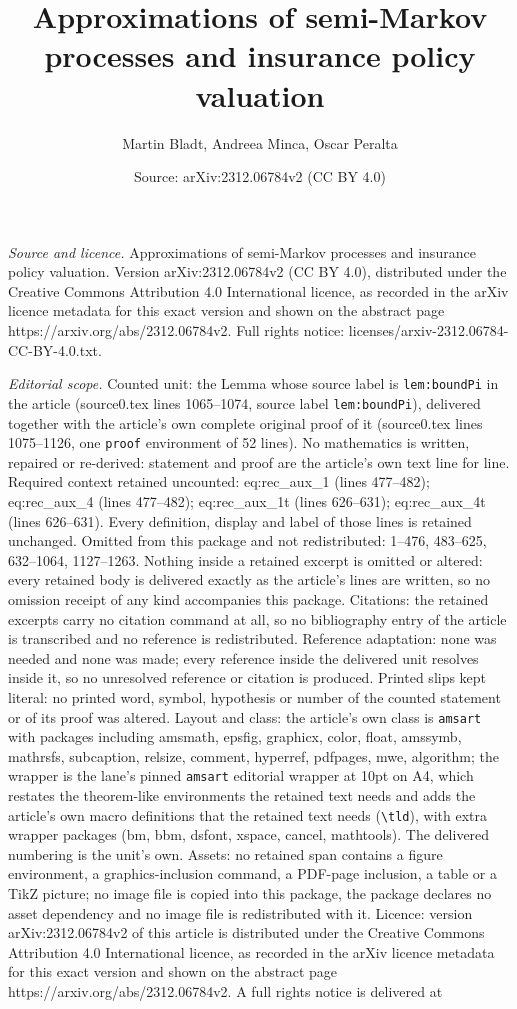 \documentclass[10pt,a4paper]{amsart}
\title[Approximations of semi-Markov processes and insurance policy]{Approximations of semi-Markov processes and insurance policy valuation}
\author{Martin Bladt, Andreea Minca, Oscar Peralta}
\date{Source: arXiv:2312.06784v2 (CC BY 4.0)}
\begin{document}
\maketitle

\noindent\emph{Source and licence.} Approximations of semi-Markov processes and insurance policy valuation. Version arXiv:2312.06784v2 (CC BY 4.0), distributed under the Creative Commons Attribution 4.0 International licence, as recorded in the arXiv licence metadata for this exact version and shown on the abstract page https://arxiv.org/abs/2312.06784v2. Full rights notice: licenses/arxiv-2312.06784-CC-BY-4.0.txt.\par\smallskip

\noindent\textit{Editorial scope.} Counted unit: the Lemma whose source label is \texttt{lem:boundPi} in the article (source0.tex lines 1065--1074, source label \texttt{lem:boundPi}), delivered together with the article's own complete original proof of it (source0.tex lines 1075--1126, one \texttt{proof} environment of 52 lines). No mathematics is written, repaired or re-derived: statement and proof are the article's own text line for line. Required context retained uncounted: eq:rec\_aux\_1 (lines 477--482); eq:rec\_aux\_4 (lines 477--482); eq:rec\_aux\_1t (lines 626--631); eq:rec\_aux\_4t (lines 626--631). Every definition, display and label of those lines is retained unchanged. Omitted from this package and not redistributed: 1--476, 483--625, 632--1064, 1127--1263. Nothing inside a retained excerpt is omitted or altered: every retained body is delivered exactly as the article's lines are written, so no omission receipt of any kind accompanies this package. Citations: the retained excerpts carry no citation command at all, so no bibliography entry of the article is transcribed and no reference is redistributed. Reference adaptation: none was needed and none was made; every reference inside the delivered unit resolves inside it, so no unresolved reference or citation is produced. Printed slips kept literal: no printed word, symbol, hypothesis or number of the counted statement or of its proof was altered. Layout and class: the article's own class is \texttt{amsart} with packages including amsmath, epsfig, graphicx, color, float, amssymb, mathrsfs, subcaption, relsize, comment, hyperref, pdfpages, mwe, algorithm; the wrapper is the lane's pinned \texttt{amsart} editorial wrapper at 10pt on A4, which restates the theorem-like environments the retained text needs and adds the article's own macro definitions that the retained text needs (\texttt{\textbackslash tld}), with extra wrapper packages (bm, bbm, dsfont, xspace, cancel, mathtools). The delivered numbering is the unit's own. Assets: no retained span contains a figure environment, a graphics-inclusion command, a PDF-page inclusion, a table or a TikZ picture; no image file is copied into this package, the package declares no asset dependency and no image file is redistributed with it. Licence: version arXiv:2312.06784v2 of this article is distributed under the Creative Commons Attribution 4.0 International licence, as recorded in the arXiv licence metadata for this exact version and shown on the abstract page https://arxiv.org/abs/2312.06784v2. A full rights notice is delivered at 
\end{document}
